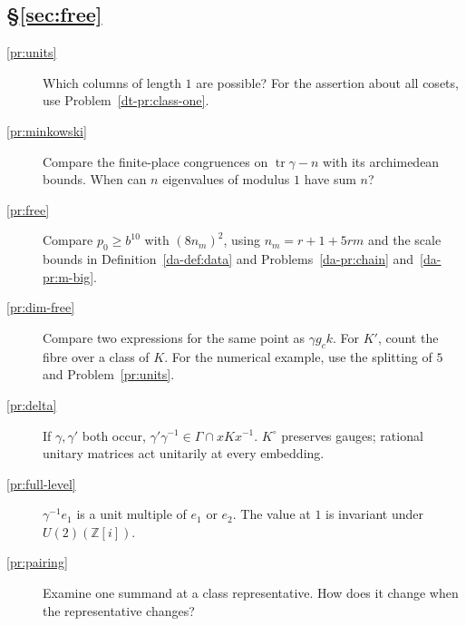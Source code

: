 \documentclass[reqno]{amsart}
\theoremstyle{definition}
\theoremstyle{plain}
\theoremstyle{remark}
\newcommand{\Z}{\mathbb{Z}}
\newcommand{\tr}{\operatorname{tr}}
\newcommand{\Ko}{K^\circ}
\begin{document}
\subsection*{\S\ref{sec:free}}
\begin{description}
\item[\ref{pr:units}] Which columns of length \(1\) are possible?  For the assertion about all cosets, use Problem~\ref{dt-pr:class-one}.
\item[\ref{pr:minkowski}] Compare the finite-place congruences on \(\tr\gamma-n\) with its archimedean bounds.  When can \(n\) eigenvalues of modulus \(1\) have sum \(n\)?
\item[\ref{pr:free}] Compare \(p_0\ge b^{10}\) with \((8n_m)^2\), using \(n_m=r+1+5rm\) and the scale bounds in Definition~\ref{da-def:data} and Problems~\ref{da-pr:chain} and~\ref{da-pr:m-big}.
\item[\ref{pr:dim-free}] Compare two expressions for the same point as \(\gamma g_ck\).  For \(K'\), count the fibre over a class of \(K\).  For the numerical example, use the splitting of \(5\) and Problem~\ref{pr:units}.
\item[\ref{pr:delta}] If \(\gamma,\gamma'\) both occur, \(\gamma'\gamma^{-1}\in\Gamma\cap xKx^{-1}\).  \(\Ko\) preserves gauges; rational unitary matrices act unitarily at every embedding.
\item[\ref{pr:full-level}] \(\gamma^{-1}e_1\) is a unit multiple of \(e_1\) or \(e_2\).  The value at \(1\) is invariant under \(U(2)(\Z[i])\).
\item[\ref{pr:pairing}] Examine one summand at a class representative.  How does it change when the representative changes?
\end{description}
\end{document}
